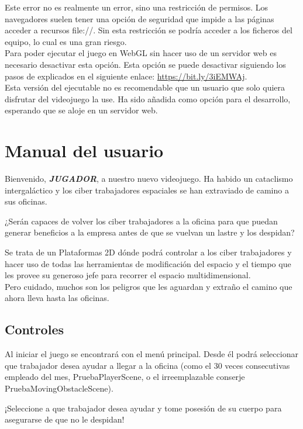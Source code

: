 Este error no es realmente un error, sino una restricción de permisos. Los navegadores suelen tener una opción de seguridad que impide a las páginas acceder a recursos file://. Sin esta restricción se podría acceder a los ficheros del equipo, lo cual es una gran riesgo.\\
Para poder ejecutar el juego en WebGL sin hacer uso de un servidor web es necesario desactivar esta opción. Esta opción se puede desactivar siguiendo los pasos de explicados en el siguiente enlace: \url{https://bit.ly/3iEMWAj}.\\
Esta versión del ejecutable no es recomendable que un usuario que solo quiera disfrutar del videojuego la use. Ha sido añadida como opción para el desarrollo, esperando que se aloje en un servidor web.

\section{Manual del usuario}
Bienvenido, \textit{\textbf{JUGADOR}}, a nuestro nuevo videojuego. Ha habido un \textcolor{endeavour}{cataclismo intergaláctico} y los \textcolor{azulWorker}{ciber trabajadores espaciales} se han extraviado de camino a sus oficinas.


¿Serán capaces de volver los \textcolor{azulWorker}{ciber trabajadores} a la oficina para que puedan generar beneficios a la empresa antes de que se vuelvan un lastre y los despidan?

Se trata de un Plataformas 2D dónde podrá controlar a los \textcolor{azulWorker}{ciber trabajadores} y hacer uso de todas las herramientas de modificación del espacio y el tiempo que les provee su generoso jefe para recorrer el \textcolor{endeavour}{espacio multidimensional}.\\
Pero cuidado, muchos son los peligros que les aguardan y extraño el camino que ahora lleva hasta las oficinas.

\subsection{Controles}
Al iniciar el juego se encontrará con el menú principal. Desde él podrá seleccionar que \textcolor{azulWorker}{trabajador} desea ayudar a llegar a la oficina (como el 30 veces consecutivas empleado del mes, PruebaPlayerScene, o el irreemplazable conserje PruebaMovingObstacleScene).

¡Seleccione a que \textcolor{azulWorker}{trabajador} desea ayudar y tome posesión de su cuerpo para asegurarse de que no le despidan!

